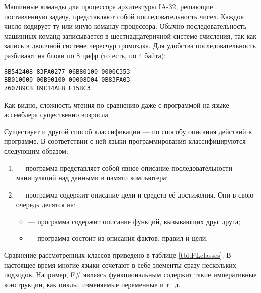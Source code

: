 
Машинные команды для процессора архитектуры IA-32, решающие
поставленную задачу, представляют собой последовательность
чисел. Каждое число кодирует ту или иную команду процессора. Обычно
последовательность машинных команд записывается в шестнадцатеричной
системе счисления, так как запись в двоичной системе чересчур
громоздка. Для удобства последовательность разбивают на блоки по 8
цифр (то есть, по 4 байта):

\begin{lstlisting}
8B542408 83FA0277 06B80100 0000C353
BB010000 00B90100 00008D04 0B83FA03
760789CB 89C14AEB F15BC3
\end{lstlisting}

Как видно, сложность чтения по сравнению даже с программой на языке
ассемблера существенно возросла.


Существует и другой способ классификации — по способу описания
действий в программе.  В соответствии с ней языки программирования
классифицируются следующим образом:

\begin{enumerate}
\item {} — программа представляет
  собой явное описание последовательности манипуляций над данными в
  памяти компьютера;
\item {} — программа содержит
  описание цели и средств её достижения. Они в свою очередь делятся
  на:
  \begin{itemize}
  \item {} — программа
    содержит описание функций, вызывающих друг друга;
  \item {} — программа состоит из
    описания фактов, правил и цели.
  \end{itemize}
\end{enumerate}

Сравнение рассмотренных классов приведено в таблице
\ref{tbl:PLclasses}.  В настоящее время многие языки сочетают в себе
элементы сразу нескольких подходов. Например, F\# являясь
функциональным содержит такие императивные конструкции, как циклы,
изменяемые переменные и т.~д.


